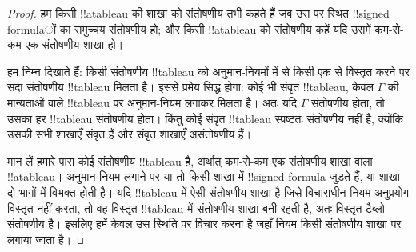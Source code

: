 \documentclass[../../../include/open-logic-section]{subfiles}
\begin{document}
\begin{proof}
हम किसी !!a{tableau} की शाखा को संतोषणीय तभी कहते हैं जब उस पर स्थित
!!{signed formula}ों का समुच्चय संतोषणीय हो; और किसी !!a{tableau} को
संतोषणीय कहें यदि उसमें कम-से-कम एक संतोषणीय शाखा हो।

हम निम्न दिखाते हैं: किसी संतोषणीय !!{tableau} को अनुमान-नियमों में से किसी
एक से विस्तृत करने पर सदा संतोषणीय !!{tableau} मिलता है। इससे प्रमेय सिद्ध
होगा: कोई भी संवृत !!{tableau}, केवल $\Gamma$ की मान्यताओं वाले !!{tableau}
पर अनुमान-नियम लगाकर मिलता है। अतः यदि $\Gamma$ संतोषणीय होता, तो उसका हर
!!{tableau} संतोषणीय होता। किंतु कोई संवृत !!{tableau} स्पष्टतः संतोषणीय
नहीं है, क्योंकि उसकी सभी शाखाएँ संवृत हैं और संवृत शाखाएँ असंतोषणीय हैं।

मान लें हमारे पास कोई संतोषणीय !!{tableau} है, अर्थात् कम-से-कम एक
संतोषणीय शाखा वाला !!a{tableau}। अनुमान-नियम लगाने पर या तो किसी शाखा में
!!{signed formula} जुड़ते हैं, या शाखा दो भागों में विभक्त होती है। यदि
!!{tableau} में ऐसी संतोषणीय शाखा है जिसे विचाराधीन नियम-अनुप्रयोग विस्तृत
नहीं करता, तो वह विस्तृत !!{tableau} में संतोषणीय शाखा बनी रहती है, अतः
विस्तृत टैब्लो संतोषणीय है। इसलिए हमें केवल उस स्थिति पर विचार करना है
जहाँ नियम किसी संतोषणीय शाखा पर लगाया जाता है।


\end{proof}
\end{document}
